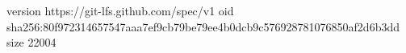 version https://git-lfs.github.com/spec/v1
oid sha256:80f972314657547aaa7ef9cb79be79ee4b0dcb9c576928781076850af2d6b3dd
size 22004
